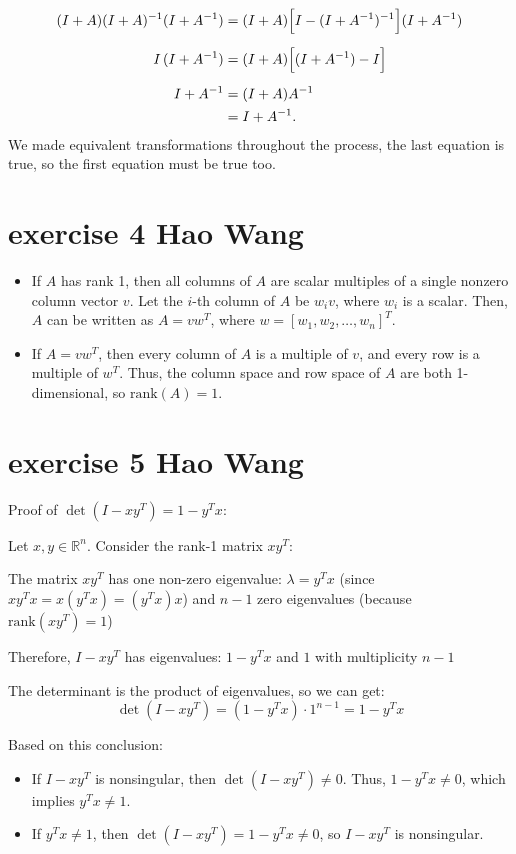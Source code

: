 \documentclass{article}
\begin{document}
\begin{align*}
    (I+A)(I+A)^{-1}(I+A^{-1})
     & = (I+A)\Bigl[I-(I+A^{-1})^{-1}\Bigr](I+A^{-1}) \\[2mm]
    I\,(I+A^{-1})
     & = (I+A)\Bigl[(I+A^{-1})-I\Bigr]                \\[2mm]
    I+A^{-1}
     & = (I+A)A^{-1}                                  \\
     & = I+A^{-1}.
\end{align*}
We made equivalent transformations throughout the process, the last equation is true, so the first equation must be true too.

\section{exercise 4 Hao Wang}

\begin{itemize}
    \item If \( A \) has rank 1, then all columns of \( A \) are scalar multiples of a single nonzero column vector \( v \). Let the \( i \)-th column of \( A \) be \( w_i v \), where \( w_i \) is a scalar. Then, \( A \) can be written as \( A = vw^T \), where \( w = [w_1, w_2, \dots, w_n]^T \).
    
    \item If \( A = vw^T \), then every column of \( A \) is a multiple of \( v \), and every row is a multiple of \( w^T \). Thus, the column space and row space of \( A \) are both 1-dimensional, so \( \text{rank}(A) = 1 \).
\end{itemize}

\section{exercise 5 Hao Wang}

Proof of $\det(I - xy^T) = 1 - y^T x$:

Let $x, y \in \mathbb{R}^n$. Consider the rank-1 matrix $xy^T$:

The matrix $xy^T$ has one non-zero eigenvalue: $\lambda = y^T x$ (since $xy^T x = x(y^T x) = (y^T x)x$) and $n-1$ zero eigenvalues (because $\text{rank}(xy^T) = 1$)

Therefore, $I - xy^T$ has eigenvalues: $1 - y^T x$ and $1$ with multiplicity $n-1$

The determinant is the product of eigenvalues, so we can get:
\[
\det(I - xy^T) = (1 - y^T x) \cdot 1^{n-1} = 1 - y^T x
\]

Based on this conclusion:
\begin{itemize}
    \item If \( I - xy^T \) is nonsingular, then \( \det(I - xy^T) \neq 0 \). Thus, \( 1 - y^T x \neq 0 \), which implies \( y^T x \neq 1 \).
    
    \item  If \( y^T x \neq 1 \), then \( \det(I - xy^T) = 1 - y^T x \neq 0 \), so \( I - xy^T \) is nonsingular.
\end{itemize}
\end{document}
